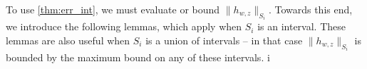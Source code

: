 To use \cref{thm:err_int}, we must evaluate or bound \( \|h_{w,z}\|_{S_i} \).
Towards this end, we introduce the following lemmas, which apply when  $S_i$ is an interval.
These lemmas are also useful when $S_i$ is a union of intervals -- in that case $\|h_{w,z}\|_{S_i}$ is bounded by the maximum bound on any of these intervals.
i
